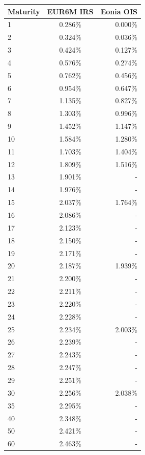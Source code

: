 \medskip
\begin{center}
\begin{tabular}{|l|c|r|}
  \hline
  Maturity & EUR6M IRS & Eonia OIS  \\
  \hline
  1 & 0.286\% & 0.000\% \\
  2 & 0.324\%  & 0.036\% \\
  3 & 0.424\%  & 0.127\% \\
  4 & 0.576\%  & 0.274\% \\
  5 & 0.762\%  & 0.456\% \\
  6 & 0.954\%  & 0.647\% \\
  7 & 1.135\%  & 0.827\% \\
  8 & 1.303\%  & 0.996\% \\
  9 & 1.452\%  & 1.147\% \\
  10 & 1.584\%  & 1.280\% \\
  11 & 1.703\%  & 1.404\% \\
  12 & 1.809\%  & 1.516\% \\
  13 & 1.901\%  & - \\
  14 & 1.976\%  & - \\
  15 & 2.037\%  &  1.764\%\\
  16 & 2.086\%  & - \\
  17 & 2.123\%  & - \\
  18 & 2.150\%  & - \\
  19 & 2.171\%  & - \\
  20 & 2.187\%  & 1.939\% \\
  21 & 2.200\%  & - \\
  22 & 2.211\%  & - \\
  23 & 2.220\%  & - \\
  24 & 2.228\%  & - \\
  25 & 2.234\%  & 2.003\% \\
  26 & 2.239\%  & - \\
  27 & 2.243\%  & - \\
  28 & 2.247\%  & - \\
  29 & 2.251\%  & - \\
  30 & 2.256\%  & 2.038\% \\
  35 & 2.295\%  & - \\
  40 & 2.348\%  & - \\
  50 & 2.421\%  & - \\
  60 & 2.463\%  & - \\
  \hline
\end{tabular}
\end{center}
